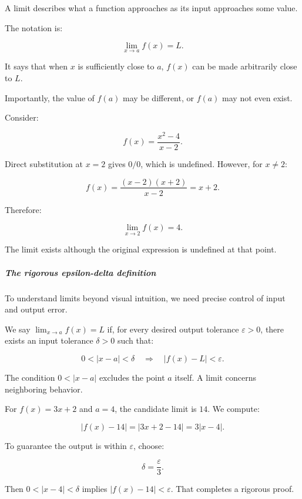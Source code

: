 \hypertarget{01-foundations-i-ch020-limits-understanding-behavior-without-necessarily-evaluating-a-point}{}

A limit describes what a function approaches as its input approaches some value.

The notation is:

\[
\lim_{x\to a}f(x)=L.
\]

It says that when \(x\) is sufficiently close to \(a\), \(f(x)\) can be made arbitrarily close to \(L\).

Importantly, the value of \(f(a)\) may be different, or \(f(a)\) may not even exist.

Consider:

\[
f(x)=\frac{x^2-4}{x-2}.
\]

Direct substitution at \(x=2\) gives \(0/0\), which is undefined. However, for \(x\ne2\):

\[
f(x)=\frac{(x-2)(x+2)}{x-2}=x+2.
\]

Therefore:

\[
\boxed{\lim_{x\to2}f(x)=4}.
\]

The limit exists although the original expression is undefined at that point.

\subparagraph{The rigorous epsilon-delta definition}\label{01-foundations-i-ch020-the-rigorous-epsilon-delta-definition}

\hypertarget{01-foundations-i-ch020-the-rigorous-epsilon-delta-definition}{}

To understand limits beyond visual intuition, we need precise control of input and output error.

We say \(\lim_{x\to a}f(x)=L\) if, for every desired output tolerance \(\varepsilon>0\), there exists an input tolerance \(\delta>0\) such that:

\[
0<|x-a|<\delta \quad\Longrightarrow\quad |f(x)-L|<\varepsilon.
\]

The condition \(0<|x-a|\) excludes the point \(a\) itself. A limit concerns neighboring behavior.

For \(f(x)=3x+2\) and \(a=4\), the candidate limit is \(14\). We compute:

\[
|f(x)-14|=|3x+2-14|=3|x-4|.
\]

To guarantee the output is within \(\varepsilon\), choose:

\[
\delta=\frac{\varepsilon}{3}.
\]

Then \(0<|x-4|<\delta\) implies \(|f(x)-14|<\varepsilon\). That completes a rigorous proof.


